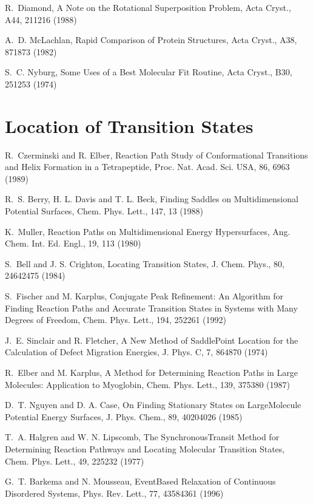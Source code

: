 \documentclass[letterpaper,11pt,english]{sphinxmanual}
\begin{document}
R. Diamond, A Note on the Rotational Superposition Problem, Acta Cryst., A44, 211\sphinxhyphen{}216 (1988)

A. D. McLachlan, Rapid Comparison of Protein Structures, Acta Cryst., A38, 871\sphinxhyphen{}873 (1982)

S. C. Nyburg, Some Uses of a Best Molecular Fit Routine, Acta Cryst., B30, 251\sphinxhyphen{}253 (1974)


\section{Location of Transition States}
\label{\detokenize{text/references:location-of-transition-states}}
R. Czerminski and R. Elber, Reaction Path Study of Conformational Transitions and Helix Formation in a Tetrapeptide, Proc. Nat. Acad. Sci. USA, 86, 6963 (1989)

R. S. Berry, H. L. Davis and T. L. Beck, Finding Saddles on Multidimensional Potential Surfaces, Chem. Phys. Lett., 147, 13 (1988)

K. Muller, Reaction Paths on Multidimensional Energy Hypersurfaces, Ang. Chem. Int. Ed. Engl., 19, 1\sphinxhyphen{}13 (1980)

S. Bell and J. S. Crighton, Locating Transition States, J. Chem. Phys., 80, 2464\sphinxhyphen{}2475 (1984)

S. Fischer and M. Karplus, Conjugate Peak Refinement: An Algorithm for Finding Reaction Paths and Accurate Transition States in Systems with Many Degrees of Freedom, Chem. Phys. Lett., 194, 252\sphinxhyphen{}261 (1992)

J. E. Sinclair and R. Fletcher, A New Method of Saddle\sphinxhyphen{}Point Location for the Calculation of Defect Migration Energies, J. Phys. C, 7, 864\sphinxhyphen{}870 (1974)

R. Elber and M. Karplus, A Method for Determining Reaction Paths in Large Molecules:  Application to Myoglobin, Chem. Phys. Lett., 139, 375\sphinxhyphen{}380 (1987)

D. T. Nguyen and D. A. Case, On Finding Stationary States on Large\sphinxhyphen{}Molecule Potential Energy Surfaces, J. Phys. Chem., 89, 4020\sphinxhyphen{}4026 (1985)

T. A. Halgren and W. N. Lipscomb, The Synchronous\sphinxhyphen{}Transit Method for Determining Reaction Pathways and Locating Molecular Transition States, Chem. Phys. Lett., 49, 225\sphinxhyphen{}232 (1977)

G. T. Barkema and N. Mousseau, Event\sphinxhyphen{}Based Relaxation of Continuous Disordered Systems, Phys. Rev. Lett., 77, 4358\sphinxhyphen{}4361 (1996)



\renewcommand{\indexname}{Index}
\printindex
\end{document}
